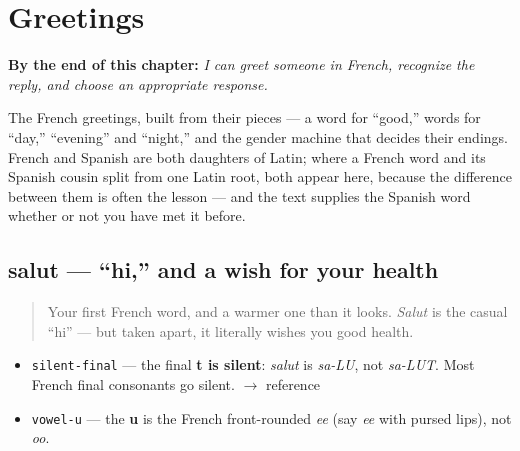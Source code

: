 
\chapter{Greetings}
\label{ch:greetings}

\begin{chapteropening}
\textbf{By the end of this chapter:} \emph{I can greet someone in French, recognize the reply, and choose an appropriate response.}

The French greetings, built from their pieces — a word for “good,” words for “day,” “evening” and “night,” and the gender machine that decides their endings. French and Spanish are both daughters of Latin; where a French word and its Spanish cousin split from one Latin root, both appear here, because the difference between them is often the lesson — and the text supplies the Spanish word whether or not you have met it before.
\end{chapteropening}

\section[salut]{salut — \textquotedblleft{}hi,\textquotedblright{} and a wish for your health}

\label{lesson:FR-C01-salut}



\begin{quote}
Your first French word, and a warmer one than it looks. \emph{Salut} is the casual \textquotedblleft{}hi\textquotedblright{} — but taken apart, it literally wishes you good health.
\end{quote}

\begin{sounds}
\begin{itemize}
\raggedright
  \item \texttt{silent-final} — the final \textbf{t is silent}: \emph{salut} is \emph{sa-LU}, not \emph{sa-LUT}. Most French final consonants go silent. $\to$ reference
  \item \texttt{vowel-u} — the \textbf{u} is the French front-rounded \emph{ee} (say \emph{ee} with pursed lips), not \emph{oo}.
\end{itemize}
\end{sounds}

